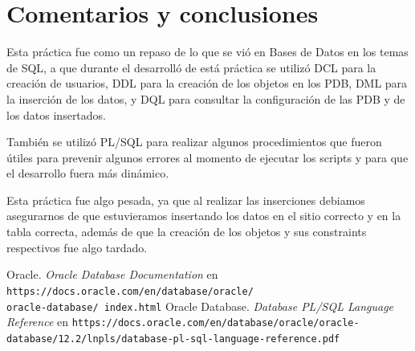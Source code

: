 \documentclass{article}
\begin{document}
\section*{Comentarios y conclusiones}

Esta práctica fue como un repaso de lo que se vió en Bases de Datos en los temas de SQL, a que durante el desarrolló de está práctica se utilizó DCL para la creación de usuarios, DDL para la creación de los objetos en los PDB, DML para la inserción de los datos, y DQL para consultar la configuración de las PDB y de los datos insertados.

También se utilizó PL/SQL para realizar algunos procedimientos que fueron útiles para prevenir algunos errores al momento de ejecutar los scripts y para que el desarrollo fuera más dinámico. 

Esta práctica fue algo pesada, ya que al realizar las inserciones debiamos asegurarnos de que estuvieramos insertando los datos en el sitio correcto y en la tabla correcta, además de que la creación de los objetos y sus constraints respectivos fue algo tardado.

\renewcommand\refname{Bibliografía}
\begin{thebibliography}{99}
     Oracle. \textit{Oracle Database Documentation} en 
        \texttt{https://docs.oracle.com/en/database/oracle/\\oracle-database/%
        index.html}
     Oracle Database. \textit{Database PL/SQL Language Reference} en 
        \texttt{https://docs.oracle.com/en/database/oracle/oracle-database/12.2/lnpls/database-pl-sql-language-reference.pdf}
\end{thebibliography}
\end{document}
